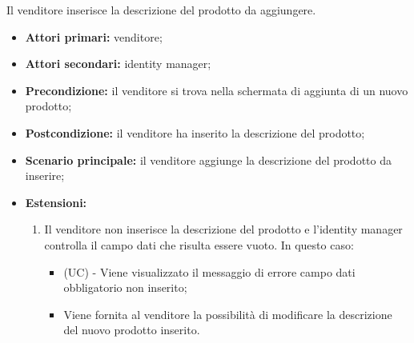 Il venditore inserisce la descrizione del prodotto da aggiungere.
\begin{itemize}
    \item \textbf{Attori primari:} venditore;
    \item \textbf{Attori secondari:} identity manager;
    \item \textbf{Precondizione:} il venditore si trova nella schermata di aggiunta di un nuovo prodotto;
    \item \textbf{Postcondizione:} il venditore ha inserito la descrizione del prodotto;
    \item \textbf{Scenario principale:} il venditore aggiunge la descrizione del prodotto da inserire;
    \item \textbf{Estensioni:}
    \begin{enumerate}[label=\lett]
    	\item Il venditore non inserisce la descrizione del prodotto e l'identity manager controlla il campo dati che risulta essere vuoto. In questo caso:
    	\begin{itemize}
    		\item (UC) - Viene visualizzato il messaggio di errore campo dati obbligatorio non inserito;
    		\item Viene fornita al venditore la possibilità di modificare la descrizione del nuovo prodotto inserito.
    	\end{itemize}
    \end{enumerate}
\end{itemize}

